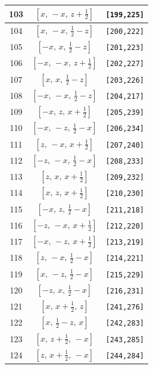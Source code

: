 \documentclass[fleqn,8pt]{jsarticle}
\begin{document}
\begin{longtable}{ccc}
103 & $\left[ x,\, - x,\, z + \frac{1}{2} \right]$ & {\tt [199,225]} \\ \hline
104 & $\left[ x,\, - x,\, \frac{1}{2} - z \right]$ & {\tt [200,222]} \\ \hline
105 & $\left[ - x,\, x,\, \frac{1}{2} - z \right]$ & {\tt [201,223]} \\ \hline
106 & $\left[ - x,\, - x,\, z + \frac{1}{2} \right]$ & {\tt [202,227]} \\ \hline
107 & $\left[ x,\, x,\, \frac{1}{2} - z \right]$ & {\tt [203,226]} \\ \hline
108 & $\left[ - x,\, - x,\, \frac{1}{2} - z \right]$ & {\tt [204,217]} \\ \hline
109 & $\left[ - x,\, z,\, x + \frac{1}{2} \right]$ & {\tt [205,239]} \\ \hline
110 & $\left[ - x,\, - z,\, \frac{1}{2} - x \right]$ & {\tt [206,234]} \\ \hline
111 & $\left[ z,\, - x,\, x + \frac{1}{2} \right]$ & {\tt [207,240]} \\ \hline
112 & $\left[ - z,\, - x,\, \frac{1}{2} - x \right]$ & {\tt [208,233]} \\ \hline
113 & $\left[ z,\, x,\, x + \frac{1}{2} \right]$ & {\tt [209,232]} \\ \hline
114 & $\left[ x,\, z,\, x + \frac{1}{2} \right]$ & {\tt [210,230]} \\ \hline
115 & $\left[ - x,\, z,\, \frac{1}{2} - x \right]$ & {\tt [211,218]} \\ \hline
116 & $\left[ - z,\, - x,\, x + \frac{1}{2} \right]$ & {\tt [212,220]} \\ \hline
117 & $\left[ - x,\, - z,\, x + \frac{1}{2} \right]$ & {\tt [213,219]} \\ \hline
118 & $\left[ z,\, - x,\, \frac{1}{2} - x \right]$ & {\tt [214,221]} \\ \hline
119 & $\left[ x,\, - z,\, \frac{1}{2} - x \right]$ & {\tt [215,229]} \\ \hline
120 & $\left[ - z,\, x,\, \frac{1}{2} - x \right]$ & {\tt [216,231]} \\ \hline
121 & $\left[ x,\, x + \frac{1}{2},\, z \right]$ & {\tt [241,276]} \\ \hline
122 & $\left[ x,\, \frac{1}{2} - z,\, x \right]$ & {\tt [242,283]} \\ \hline
123 & $\left[ x,\, z + \frac{1}{2},\, - x \right]$ & {\tt [243,285]} \\ \hline
124 & $\left[ z,\, x + \frac{1}{2},\, - x \right]$ & {\tt [244,284]} \\ \hline

\end{longtable}
\end{document}

